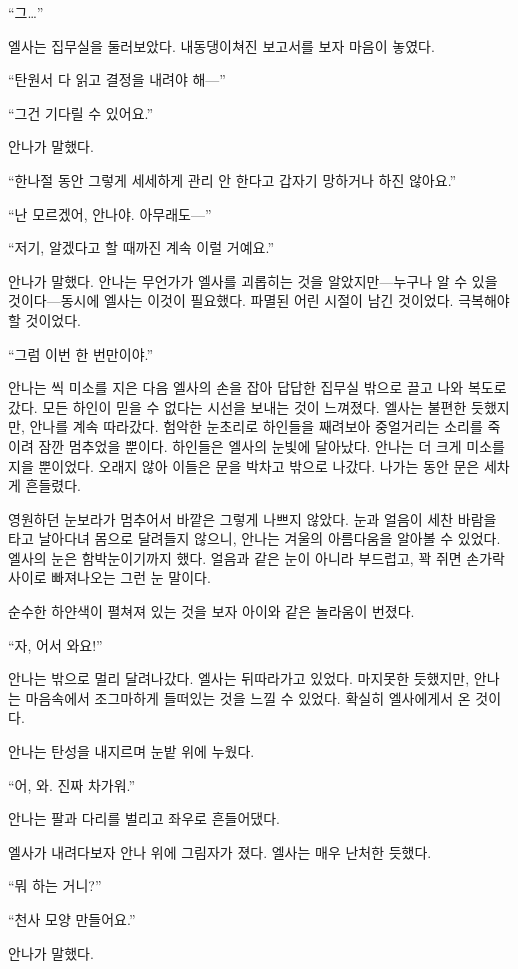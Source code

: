 ``그\ldots''

엘사는 집무실을 둘러보았다. 내동댕이쳐진 보고서를 보자 마음이 놓였다.

``탄원서 다 읽고 결정을 내려야 해—''

``그건 기다릴 수 있어요.''

안나가 말했다.

``한나절 동안 그렇게 세세하게 관리 안 한다고 갑자기 망하거나 하진 않아요.''

``난 모르겠어, 안나야. 아무래도—''

``저기, 알겠다고 할 때까진 계속 이럴 거예요.''

안나가 말했다. 안나는 무언가가 엘사를 괴롭히는 것을 알았지만—누구나 알 수 있을 것이다—동시에 엘사는 이것이 필요했다. 파멸된 어린 시절이 남긴 것이었다. 극복해야 할 것이었다.

``그럼 이번 한 번만이야.''

안나는 씩 미소를 지은 다음 엘사의 손을 잡아 답답한 집무실 밖으로 끌고 나와 복도로 갔다. 모든 하인이 믿을 수 없다는 시선을 보내는 것이 느껴졌다. 엘사는 불편한 듯했지만, 안나를 계속 따라갔다. 험악한 눈초리로 하인들을 째려보아 중얼거리는 소리를 죽이려 잠깐 멈추었을 뿐이다. 하인들은 엘사의 눈빛에 달아났다. 안나는 더 크게 미소를 지을 뿐이었다. 오래지 않아 이들은 문을 박차고 밖으로 나갔다. 나가는 동안 문은 세차게 흔들렸다.

영원하던 눈보라가 멈추어서 바깥은 그렇게 나쁘지 않았다. 눈과 얼음이 세찬 바람을 타고 날아다녀 몸으로 달려들지 않으니, 안나는 겨울의 아름다움을 알아볼 수 있었다. 엘사의 눈은 함박눈이기까지 했다. 얼음과 같은 눈이 아니라 부드럽고, 꽉 쥐면 손가락 사이로 빠져나오는 그런 눈 말이다.

순수한 하얀색이 펼쳐져 있는 것을 보자 아이와 같은 놀라움이 번졌다.

``자, 어서 와요!''

안나는 밖으로 멀리 달려나갔다. 엘사는 뒤따라가고 있었다. 마지못한 듯했지만, 안나는 마음속에서 조그마하게 들떠있는 것을 느낄 수 있었다. 확실히 엘사에게서 온 것이다.

안나는 탄성을 내지르며 눈밭 위에 누웠다.

``어, 와. 진짜 차가워.''

안나는 팔과 다리를 벌리고 좌우로 흔들어댔다.

엘사가 내려다보자 안나 위에 그림자가 졌다. 엘사는 매우 난처한 듯했다.

``뭐 하는 거니?''

``천사 모양 만들어요.''

안나가 말했다.

